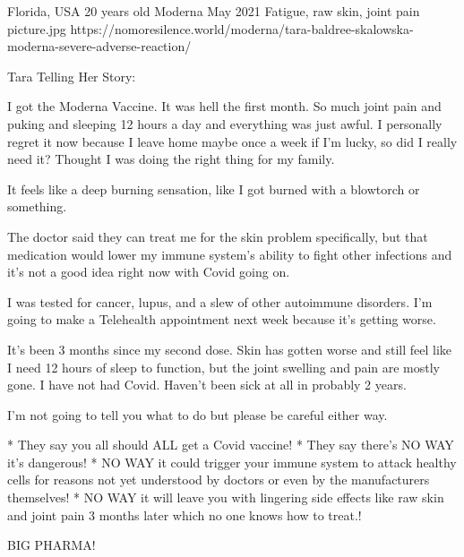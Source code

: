 {Florida, USA}
{20 years old}
{Moderna}
{May 2021}
{Fatigue, raw skin, joint pain}
{picture.jpg}
{https://nomoresilence.world/moderna/tara-baldree-skalowska-moderna-severe-adverse-reaction/}
{


Tara Telling Her Story:

I got the Moderna Vaccine. It was hell the first month. So much joint pain and puking and sleeping 12 hours a day and everything was just awful. I personally regret it now because I leave home maybe once a week if I’m lucky, so did I really need it? Thought I was doing the right thing for my family.

It feels like a deep burning sensation, like I got burned with a blowtorch or something.

The doctor said they can treat me for the skin problem specifically, but that medication would lower my immune system’s ability to fight other infections and it’s not a good idea right now with Covid going on.

I was tested for cancer, lupus, and a slew of other autoimmune disorders. I’m going to make a Telehealth appointment next week because it’s getting worse.

It’s been 3 months since my second dose. Skin has gotten worse and still feel like I need 12 hours of sleep to function, but the joint swelling and pain are mostly gone. I have not had Covid. Haven’t been sick at all in probably 2 years.

I’m not going to tell you what to do but please be careful either way.

  * They say you all should ALL get a Covid vaccine!
  * They say there’s NO WAY it’s dangerous!
  * NO WAY it could trigger your immune system to attack healthy cells for reasons not yet understood by doctors or even by the manufacturers themselves!
  * NO WAY it will leave you with lingering side effects like raw skin and joint pain 3 months later which no one knows how to treat.!

BIG PHARMA!
}

